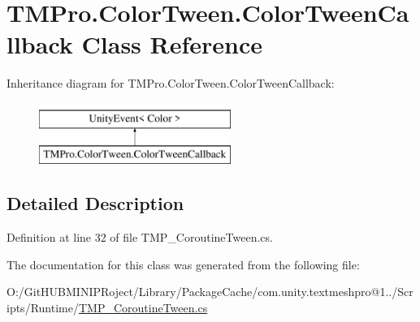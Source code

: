 \hypertarget{class_t_m_pro_1_1_color_tween_1_1_color_tween_callback}{}\section{T\+M\+Pro.\+Color\+Tween.\+Color\+Tween\+Callback Class Reference}
\label{class_t_m_pro_1_1_color_tween_1_1_color_tween_callback}
Inheritance diagram for T\+M\+Pro.\+Color\+Tween.\+Color\+Tween\+Callback\+:\begin{figure}[H]
\begin{center}
\leavevmode
\includegraphics[height=2.000000cm]{class_t_m_pro_1_1_color_tween_1_1_color_tween_callback}
\end{center}
\end{figure}


\subsection{Detailed Description}


Definition at line 32 of file T\+M\+P\+\_\+\+Coroutine\+Tween.\+cs.



The documentation for this class was generated from the following file\+:\begin{DoxyCompactItemize}
\item 
O\+:/\+Git\+H\+U\+B\+M\+I\+N\+I\+P\+Roject/\+Library/\+Package\+Cache/com.\+unity.\+textmeshpro@1../\+Scripts/\+Runtime/\mbox{\hyperlink{_t_m_p___coroutine_tween_8cs}{T\+M\+P\+\_\+\+Coroutine\+Tween.\+cs}}\end{DoxyCompactItemize}
